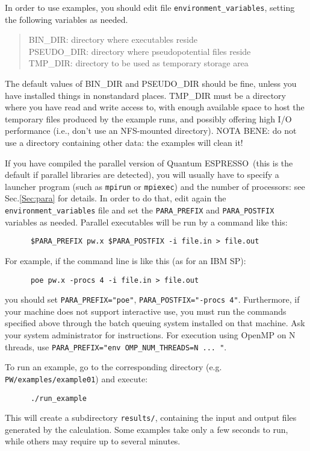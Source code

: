 \documentclass[12pt,a4paper]{article}
\def\qe{{\sc Quantum ESPRESSO}}
\begin{document}
In order to use examples, you should edit file \texttt{environment\_variables},
setting the following variables as needed.
\begin{quote}
   BIN\_DIR: directory where executables reside\\
   PSEUDO\_DIR: directory where pseudopotential files reside\\
   TMP\_DIR: directory to be used as temporary storage area
\end{quote}
The default values of BIN\_DIR and PSEUDO\_DIR should be fine,
unless you have installed things in nonstandard places. TMP\_DIR
must be a directory where you have read and write access to, with
enough available space to host the temporary files produced by the
example runs, and possibly offering high I/O performance (i.e., don't
use an NFS-mounted directory). NOTA BENE: do not use a
directory containing other data: the examples will clean it!

If you have compiled the parallel version of \qe\ (this
is the default if parallel libraries are detected), you will usually
have to specify a launcher program (such as \texttt{mpirun} or
\texttt{mpiexec}) and the number of processors: see Sec.\ref{Sec:para} for
details. In order to do that, edit again the \texttt{environment\_variables}
file and set the \texttt{PARA\_PREFIX} and \texttt{PARA\_POSTFIX} variables
as needed. Parallel executables will be run by a command like this:
\begin{verbatim}
      $PARA_PREFIX pw.x $PARA_POSTFIX -i file.in > file.out
\end{verbatim}
For example, if the command line is like this (as for an IBM SP):
\begin{verbatim}
      poe pw.x -procs 4 -i file.in > file.out
\end{verbatim}
you should set \texttt{PARA\_PREFIX="poe"}, \texttt{PARA\_POSTFIX="-procs 4"}.
Furthermore, if your machine does not support interactive use, you
must run the commands specified above through the batch queuing
system installed on that machine. Ask your system administrator for
instructions. For execution using OpenMP on N threads,
use \texttt{PARA\_PREFIX="env OMP\_NUM\_THREADS=N ... "}.

To run an example, go to the corresponding directory (e.g.
 \texttt{PW/examples/example01}) and execute:
\begin{verbatim}
      ./run_example
\end{verbatim}
This will create a subdirectory \texttt{results/}, containing the input and
output files generated by the calculation. Some examples take only a
few seconds to run, while others may require up to several minutes.
\end{document}
